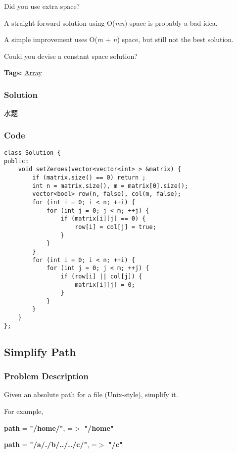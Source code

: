 \documentclass{article}
\begin{document}
\begin{CJK*}{UTF8}{gkai}
Did you use extra space?


A straight forward solution using O(\emph{m}\emph{n}) space is probably a bad idea.


A simple improvement uses O(\emph{m} + \emph{n}) space, but still not the best solution.


Could you devise a constant space solution?


\textbf{Tags: }
\hyperref[ Array ]{ Array }



\subsubsection*{Solution}
水题

\subsubsection*{Code}
\begin{lstlisting}
class Solution {
public:
    void setZeroes(vector<vector<int> > &matrix) {
        if (matrix.size() == 0) return ;
        int n = matrix.size(), m = matrix[0].size();
        vector<bool> row(n, false), col(m, false);
        for (int i = 0; i < n; ++i) {
            for (int j = 0; j < m; ++j) {
                if (matrix[i][j] == 0) {
                    row[i] = col[j] = true;
                }
            }
        }
        for (int i = 0; i < n; ++i) {
            for (int j = 0; j < m; ++j) {
                if (row[i] || col[j]) {
                    matrix[i][j] = 0;
                }
            }
        }
    }
}; 
\end{lstlisting}


\subsection{ Simplify Path }
\label{ Simplify Path }

\subsubsection*{Problem Description}
Given an absolute path for a file (Unix-style), simplify it.

For example,


\textbf{path} = \textbf{"/home/"}, =$>$ \textbf{"/home"}


\textbf{path} = \textbf{"/a/./b/../../c/"}, =$>$ \textbf{"/c"}


\end{CJK*}
\end{document}
